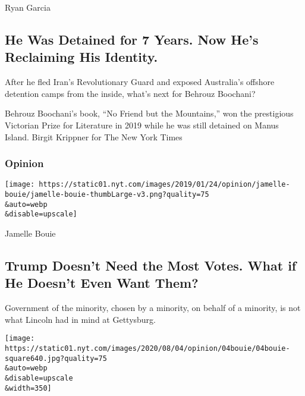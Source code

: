 Ryan Garcia

\href{/2020/08/04/magazine/behrouz-boochani-australia.html}{}

\hypertarget{he-was-detained-for-7-years-now-hes-reclaiming-his-identity}{%
\subsection{He Was Detained for 7 Years. Now He's Reclaiming His
Identity.}\label{he-was-detained-for-7-years-now-hes-reclaiming-his-identity}}

After he fled Iran's Revolutionary Guard and exposed Australia's
offshore detention camps from the inside, what's next for Behrouz
Boochani?

\href{/2020/08/04/magazine/behrouz-boochani-australia.html}{}

Behrouz Boochani's book, ``No Friend but the Mountains,'' won the
prestigious Victorian Prize for Literature in 2019 while he was still
detained on Manus Island. Birgit Krippner for The New York Times

\href{https://www.nytimes.com/section/opinion?pagetype=Homepage\&action=click\&module=Opinion}{}

\hypertarget{opinion}{%
\subsubsection{Opinion}\label{opinion}}

\href{/2020/08/04/opinion/trump-2020-electoral-college.html}{}

\texttt{[image: https://static01.nyt.com/images/2019/01/24/opinion/jamelle-bouie/jamelle-bouie-thumbLarge-v3.png?quality=75\\\&auto=webp\\\&disable=upscale]}

Jamelle Bouie

\hypertarget{trump-doesnt-need-the-most-votes-what-if-he-doesnt-even-want-them}{%
\subsection{Trump Doesn't Need the Most Votes. What if He Doesn't Even
Want
Them?}\label{trump-doesnt-need-the-most-votes-what-if-he-doesnt-even-want-them}}

Government of the minority, chosen by a minority, on behalf of a
minority, is not what Lincoln had in mind at Gettysburg.

\href{/2020/08/04/opinion/trump-2020-electoral-college.html}{}

\texttt{[image: https://static01.nyt.com/images/2020/08/04/opinion/04bouie/04bouie-square640.jpg?quality=75\\\&auto=webp\\\&disable=upscale\\\&width=350]}


